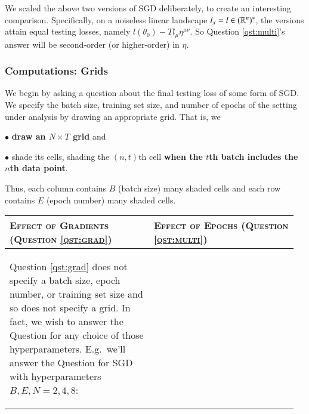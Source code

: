 \documentclass[anon,12pt]{colt2021} %
\begin{document}
                We scaled the above two versions of SGD deliberately, to create an
                interesting comparison.  Specifically, on a noiseless linear
                landscape $l_x=l \in (\mathbb{R}^n)^*$, the versions attain equal testing
                losses, namely $l(\theta_0) - T l_\mu \eta^{\mu\nu}$.
                So Question \ref{qst:multi}'s answer will be second-order (or
                higher-order) in $\eta$.



    \begin{landscape}
        \subsubsection{Computations: Grids}\label{sect:gridss}
            We begin by asking a question about the
            final testing loss of some form of SGD.
            We specify the batch size, training set size, and number of epochs
            of the setting under analysis by drawing an appropriate grid.
            That is, we 
            \par \indent $\bullet$ \textbf{draw an $N\times T$ grid} and
            \par \indent $\bullet$ shade its cells, shading
            the $(n,t)$th cell \textbf{when the $t$th batch includes the $n$th data
            point}.
            \par\noindent
            Thus, each column contains $B$ (batch size) many shaded
            cells and each row contains $E$ (epoch number) many shaded cells.
        \newline
        \par\noindent
        \begin{tabular}{p{0.48\linewidth}p{0.48\linewidth}}
            \textsc{Effect of Gradients (Question
            \ref{qst:grad})}&\textsc{Effect of Epochs (Question
            \ref{qst:multi})}\\ \hline Question \ref{qst:grad} does not specify
            a batch size, epoch number, or training set size and so does not
            specify a grid.  In fact, we wish to answer the Question for any
            choice of those hyperparameters.  E.g.\ we'll answer the
            Question for SGD with hyperparameters $B,E,N=2,4,8$:
            \begin{center}
            \par\noindent\parbox{0.90\linewidth}{
                \begin{center}

\end{center}}
\end{center}
\end{tabular}
\end{landscape}
\end{document}
